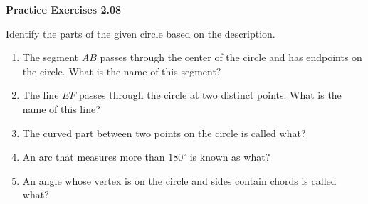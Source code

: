 \vspace{0.3ex}
\noindent\textbf{Practice Exercises 2.08}

\vspace{0.2ex}

Identify the parts of the given circle based on the description.

\begin{enumerate}
    \item The segment $AB$ passes through the center of the circle and has endpoints on the circle. What is the name of this segment?
    \item The line $EF$ passes through the circle at two distinct points. What is the name of this line?
    \item The curved part between two points on the circle is called what?
    \item An arc that measures more than $180^\circ$ is known as what?
    \item An angle whose vertex is on the circle and sides contain chords is called what?
\end{enumerate}
